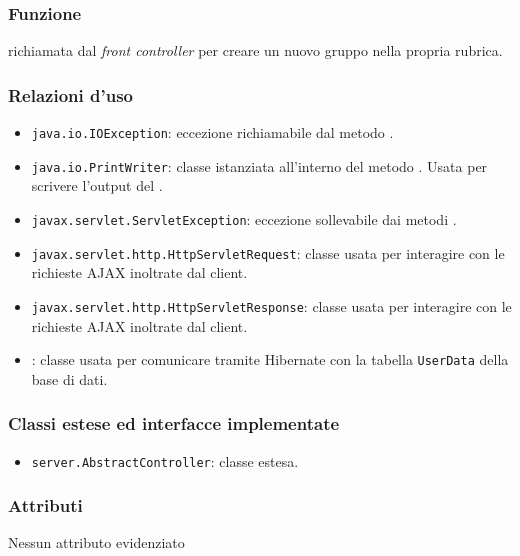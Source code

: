 

\subsubsection*{Funzione}
 richiamata dal \textit{front controller} per creare un nuovo gruppo nella propria rubrica.

\subsubsection*{Relazioni d'uso}

\begin{itemize}
	\item \texttt{java.io.IOException}: eccezione richiamabile dal metodo .
	\item \texttt{java.io.PrintWriter}: classe istanziata all'interno del metodo . Usata per scrivere l'output del .
	\item \texttt{javax.servlet.ServletException}: eccezione sollevabile dai metodi .
	\item \texttt{javax.servlet.http.HttpServletRequest}: classe usata per interagire con le richieste AJAX inoltrate dal client.
	\item \texttt{javax.servlet.http.HttpServletResponse}: classe usata per interagire con le richieste AJAX inoltrate dal client.
	\item {}: classe usata per comunicare tramite Hibernate con la tabella \texttt{UserData} della base di dati.
\end{itemize}

\subsubsection*{Classi estese ed interfacce implementate}
\begin{itemize}
	\item \texttt{server.AbstractController}: classe estesa.
\end{itemize}

\subsubsection*{Attributi}

Nessun attributo evidenziato

